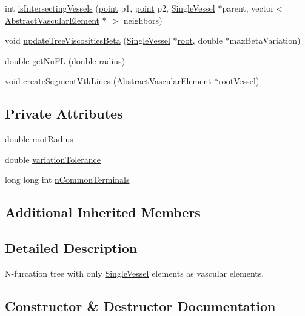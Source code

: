 \begin{DoxyCompactItemize}
\item 
int \hyperlink{class_single_vessel_c_c_o_o_tree_a7ac08a2e8d1b05eea1d6debf109caaf1}{is\+Intersecting\+Vessels} (\hyperlink{structpoint}{point} p1, \hyperlink{structpoint}{point} p2, \hyperlink{class_single_vessel}{Single\+Vessel} $\ast$parent, vector$<$ \hyperlink{class_abstract_vascular_element}{Abstract\+Vascular\+Element} $\ast$ $>$ neighbors)
\item 
void \hyperlink{class_single_vessel_c_c_o_o_tree_a08fc003426f3a8697af2f57d03a702c9}{update\+Tree\+Viscosities\+Beta} (\hyperlink{class_single_vessel}{Single\+Vessel} $\ast$\hyperlink{class_abstract_object_c_c_o_tree_ae1b17938ad34d92629915159c49bb89a}{root}, double $\ast$max\+Beta\+Variation)
\item 
double \hyperlink{class_single_vessel_c_c_o_o_tree_a125eba238125b220cb021829603e6e97}{get\+Nu\+FL} (double radius)
\item 
void \hyperlink{class_single_vessel_c_c_o_o_tree_ac213538ea943f22310f6c20e47a72170}{create\+Segment\+Vtk\+Lines} (\hyperlink{class_abstract_vascular_element}{Abstract\+Vascular\+Element} $\ast$root\+Vessel)
\end{DoxyCompactItemize}
\subsection*{Private Attributes}
\begin{DoxyCompactItemize}
\item 
double \hyperlink{class_single_vessel_c_c_o_o_tree_a92984c132be3e2eaed34adfc261afa48}{root\+Radius}
\item 
double \hyperlink{class_single_vessel_c_c_o_o_tree_abd14cc5350019a67cc3f8ff881af58e4}{variation\+Tolerance}
\item 
long long int \hyperlink{class_single_vessel_c_c_o_o_tree_a9766e247e4414d77c9a50ed4d09b3138}{n\+Common\+Terminals}
\end{DoxyCompactItemize}
\subsection*{Additional Inherited Members}


\subsection{Detailed Description}
N-\/furcation tree with only \hyperlink{class_single_vessel}{Single\+Vessel} elements as vascular elements. 

\subsection{Constructor \& Destructor Documentation}
